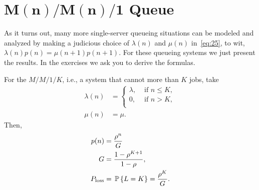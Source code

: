 \section
[$M(n)/M(n)/1$ Queue]
{$\mathbf{M(n)/M(n)/1}$ Queue}
\label{sec:mnmn1}

As it turns out, many more single-server queueing situations can be
modeled and analyzed by making a judicious choice of $\lambda(n)$ and
$\mu(n)$ in~\eqref{eq:25}, to wit,
$ \lambda(n) p(n) = \mu(n+1)p(n+1)$. For these queueing systems we
just present the results. In the exercises we ask you to derive the
formulas.

For the $M/M/1/K$, i.e., a system that cannot more than $K$ jobs, take
  \begin{align*}
    \lambda(n) &= 
  \begin{cases}
    \lambda, &\text{ if } n \leq K, \\
    0, &\text{ if } n > K, \\
  \end{cases} \\
\mu(n) &= \mu.
  \end{align*}
  Then,
\begin{subequations}\label{eq:8}
 \begin{align}
p(n) &=  \frac{\rho^n}G\\
G &= \frac{1-\rho^{K+1}}{1-\rho}, \\
P_{\text{loss}} &= \P{L=K} = \frac{\rho^K}G.
\end{align}
\end{subequations}


